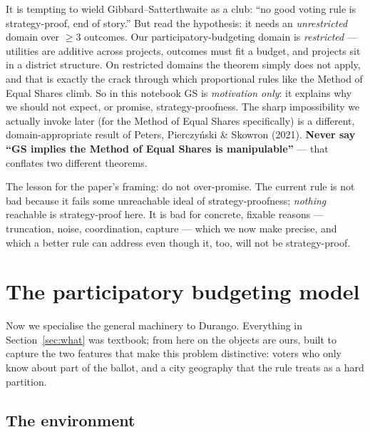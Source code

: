 \documentclass[11pt,letterpaper]{article}
\theoremstyle{definition}
\theoremstyle{plain}
\theoremstyle{remark}
\providecommand{\citet}[1]{Peters, Pierczy\'nski \& Skowron (2021)}
\begin{document}
\begin{watchout}
It is tempting to wield Gibbard--Satterthwaite as a club: ``no good voting rule is
strategy-proof, end of story.'' But read the hypothesis: it needs an \emph{unrestricted} domain
over $\ge 3$ outcomes. Our participatory-budgeting domain is \emph{restricted} --- utilities are
additive across projects, outcomes must fit a budget, and projects sit in a district structure.
On restricted domains the theorem simply does not apply, and that is exactly the crack through
which proportional rules like the Method of Equal Shares climb. So in this notebook GS is
\emph{motivation only}: it explains why we should not expect, or promise, strategy-proofness. The
sharp impossibility we actually invoke later (for the Method of Equal Shares specifically) is a
different, domain-appropriate result of \citet{peters2021}. \textbf{Never say ``GS implies the
Method of Equal Shares is manipulable''} --- that conflates two different theorems.
\end{watchout}

\begin{connection}
The lesson for the paper's framing: do not over-promise. The current rule is not bad because it
fails some unreachable ideal of strategy-proofness; \emph{nothing} reachable is
strategy-proof here. It is bad for concrete, fixable reasons --- truncation, noise, coordination,
capture --- which we now make precise, and which a better rule can address even though it, too,
will not be strategy-proof.
\end{connection}

\section{The participatory budgeting model}
\label{sec:model}

Now we specialise the general machinery to Durango. Everything in Section~\ref{sec:what} was
textbook; from here on the objects are ours, built to capture the two features that make this
problem distinctive: voters who only know about part of the ballot, and a city geography that
the rule treats as a hard partition.

\subsection{The environment}
\end{document}
